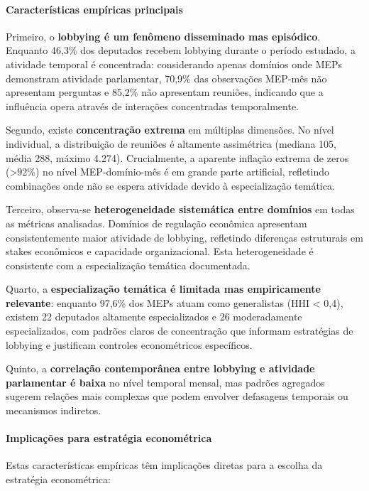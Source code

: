 \paragraph{Características empíricas principais}

Primeiro, o \textbf{lobbying é um fenômeno disseminado mas episódico}. Enquanto 46,3\% dos deputados recebem lobbying durante o período estudado, a atividade temporal é concentrada: considerando apenas domínios onde MEPs demonstram atividade parlamentar, 70,9\% das observações MEP-mês não apresentam perguntas e 85,2\% não apresentam reuniões, indicando que a influência opera através de interações concentradas temporalmente.

Segundo, existe \textbf{concentração extrema} em múltiplas dimensões. No nível individual, a distribuição de reuniões é altamente assimétrica (mediana 105, média 288, máximo 4.274). Crucialmente, a aparente inflação extrema de zeros (>92\%) no nível MEP-domínio-mês é em grande parte artificial, refletindo combinações onde não se espera atividade devido à especialização temática.

Terceiro, observa-se \textbf{heterogeneidade sistemática entre domínios} em todas as métricas analisadas. Domínios de regulação econômica apresentam consistentemente maior atividade de lobbying, refletindo diferenças estruturais em stakes econômicos e capacidade organizacional. Esta heterogeneidade é consistente com a especialização temática documentada.

Quarto, a \textbf{especialização temática é limitada mas empiricamente relevante}: enquanto 97,6\% dos MEPs atuam como generalistas (HHI < 0,4), existem 22 deputados altamente especializados e 26 moderadamente especializados, com padrões claros de concentração que informam estratégias de lobbying e justificam controles econométricos específicos.

Quinto, a \textbf{correlação contemporânea entre lobbying e atividade parlamentar é baixa} no nível temporal mensal, mas padrões agregados sugerem relações mais complexas que podem envolver defasagens temporais ou mecanismos indiretos.

\paragraph{Implicações para estratégia econométrica}

Estas características empíricas têm implicações diretas para a escolha da estratégia econométrica:


